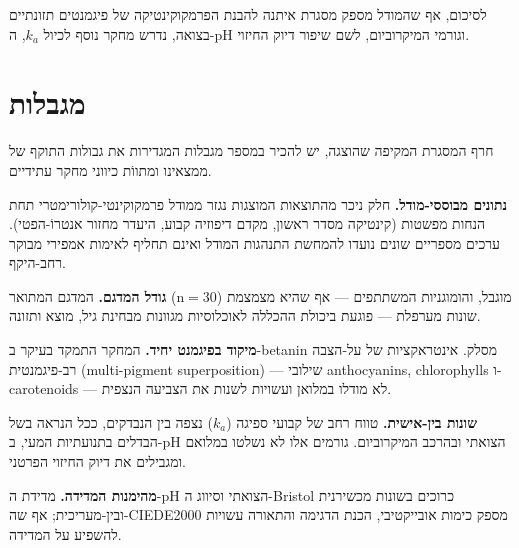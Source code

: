 \begin{hebrew}לסיכום, אף שהמודל מספק מסגרת איתנה להבנת הפרמקוקינטיקה של פיגמנטים תזונתיים בצואה, נדרש מחקר נוסף לכיול $k_a$, ה-\textenglish{pH} וגורמי המיקרוביום, לשם שיפור דיוק החיזוי.\end{hebrew}

\section{\texthebrew{מגבלות}}

\begin{hebrew}חרף המסגרת המקיפה שהוצגה, יש להכיר במספר מגבלות המגדירות את גבולות התוקף של ממצאינו ומתווֹת כיווני מחקר עתידיים.\end{hebrew}

\begin{hebrew}\textbf{נתונים מבוססי-מודל.} חלק ניכר מהתוצאות המוצגות נגזר ממודל פרמקוקינטי-קולורימטרי תחת הנחות מפשטות (קינטיקה מסדר ראשון, מקדם דיפוזיה קבוע, היעדר מחזור אנטרוֹ-הפטי). ערכים מספריים שונים נועדו להמחשת התנהגות המודל ואינם תחליף לאימות אמפירי מבוקר רחב-היקף.\end{hebrew}

\begin{hebrew}\textbf{גודל המדגם.} המדגם המתואר (\textenglish{n}$=30$) מוגבל, והומוגניות המשתתפים — אף שהיא מצמצמת שונות מערפלת — פוגעת ביכולת ההכללה לאוכלוסיות מגוונות מבחינת גיל, מוצא ותזונה.\end{hebrew}

\begin{hebrew}\textbf{מיקוד בפיגמנט יחיד.} המחקר התמקד בעיקר ב-\textenglish{betanin} מסלק. אינטראקציות של על-הצבה רב-פיגמנטית (\textenglish{multi-pigment superposition}) — שילובי \textenglish{anthocyanins}, \textenglish{chlorophylls} ו-\textenglish{carotenoids} — לא מודלו במלואן ועשויות לשנות את הצביעה הנצפית.\end{hebrew}

\begin{hebrew}\textbf{שונות בין-אישית.} טווח רחב של קבועי ספיגה ($k_a$) נצפה בין הנבדקים, ככל הנראה בשל הבדלים בתנועתיות המעי, ב-\textenglish{pH} הצואתי ובהרכב המיקרוביום. גורמים אלו לא נשלטו במלואם ומגבילים את דיוק החיזוי הפרטני.\end{hebrew}

\begin{hebrew}\textbf{מהימנות המדידה.} מדידת ה-\textenglish{pH} הצואתי וסיווג ה-\textenglish{Bristol} כרוכים בשונות מכשירנית ובין-מעריכית; אף שה-\textenglish{CIEDE2000} מספק כימות אובייקטיבי, הכנת הדגימה והתאורה עשויות להשפיע על המדידה.\end{hebrew}

